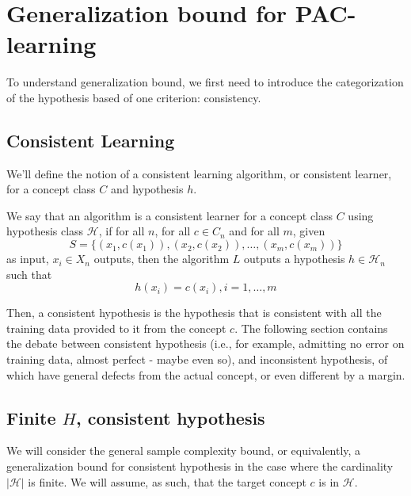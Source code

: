 \section{Generalization bound for PAC-learning}

To understand generalization bound, we first need to introduce the categorization of the hypothesis based of one criterion: consistency. 

\subsection{Consistent Learning}

We'll define the notion of a consistent learning algorithm, or consistent learner, for a concept class $C$ and hypothesis $h$. 
\begin{definition}
    We say that an algorithm is a consistent learner for a concept class $C$ using hypothesis class $\mathcal{H}$, if for all $n$, for all $c\in C_n$ and for all $m$, given 
    \begin{equation*}
        S = \{ (x_1, c(x_1)) , (x_2, c(x_2)) ,\dots, (x_m, c(x_m))  \} 
    \end{equation*}
    as input, $x_i \in X_n$ outputs, then the algorithm $L$ outputs a hypothesis $h\in \mathcal{H}_n$ such that $$h(x_i) = c(x_i) , i = 1,\dots,m$$ 
\end{definition}

Then, a consistent hypothesis is the hypothesis that is consistent with all the training data provided to it from the concept $c$. The following section contains the debate between consistent hypothesis (i.e., for example, admitting no error on training data, almost perfect - maybe even so), and inconsistent hypothesis, of which have general defects from the actual concept, or even different by a margin.  


\subsection{Finite $H$, consistent hypothesis}

We will consider the general sample complexity bound, or equivalently, a generalization bound for consistent hypothesis in the case where the cardinality $|\mathcal{H}|$ is finite. We will assume, as such, that the target concept $c$ is in $\mathcal{H}$. 

